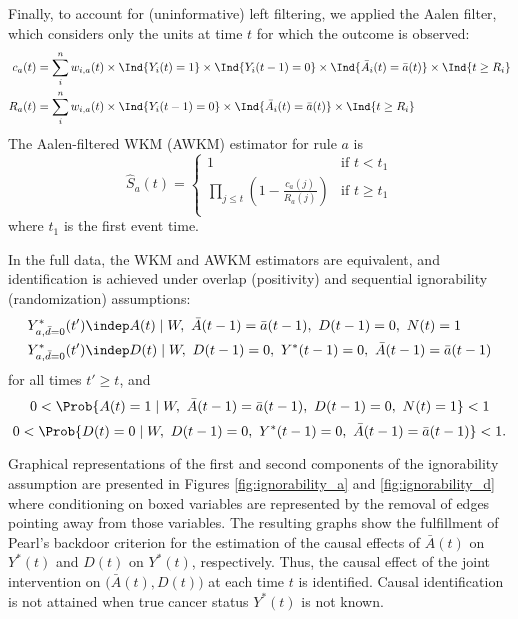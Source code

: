 \documentclass[
  11pt,
]{article}
\begin{document}
Finally, to account for (uninformative) left filtering, we applied the
Aalen filter, which considers only the units at time \(t\) for which the
outcome is observed: \[\begin{aligned}
c_{a} (t)
& = \sum_i^n w_{i, a}(t) \times \Ind{Y_i(t) = 1} \times \Ind{Y_i(t - 1) = 0} \times \Ind{\bar A_i (t) = \bar a(t)} \times \Ind{t \ge R_i} \\
R_{a} (t)
& = \sum_i^n w_{i, a}(t) \times \Ind{Y_i(t - 1) = 0} \times \Ind{\bar A_i (t) = \bar a(t)} \times \Ind{t \ge R_i}
\end{aligned}\] The Aalen-filtered WKM (AWKM) estimator for rule \(a\)
is \[\hat S_{a}(t) =
\begin{cases}
1 & \text{if } t < t_1 \\
\prod_{j \le t} \left(1 - \frac{c_{a}(j)}{R_{a}(j)}\right) & \text{if } t \ge t_1 \\
\end{cases}\] where \(t_1\) is the first event time.

In the full data, the WKM and AWKM estimators are equivalent, and
identification is achieved under overlap (positivity) and sequential
ignorability (randomization) assumptions: \[\begin{aligned}
Y^*_{a, \bar d = 0} (t')   & \indep A(t) \mid W,\ \bar A(t - 1) = \bar a(t - 1),\ D(t - 1) = 0,\ N(t) = 1\\
Y^*_{a, \bar d = 0} (t') & \indep D(t) \mid W,\ D(t - 1) = 0,\ Y^*(t - 1) = 0,\ \bar A(t - 1) = \bar a(t - 1)
\end{aligned}\] for all times \(t'\ge t\), and
\[0 < \Prob{ A(t) = 1 \mid W,\ \bar A(t - 1) = \bar a(t - 1),\ D(t - 1) = 0,\ N(t) = 1} < 1\]
\[0 < \Prob{D(t) = 0 \mid W,\ D(t - 1) = 0,\ Y^*(t - 1) = 0,\ \bar A(t - 1) = \bar a(t - 1)} < 1.\]

Graphical representations of the first and second components of the
ignorability assumption are presented in Figures
\ref{fig:ignorability_a} and \ref{fig:ignorability_d} where conditioning
on boxed variables are represented by the removal of edges pointing away
from those variables. The resulting graphs show the fulfillment of
Pearl's backdoor criterion for the estimation of the causal effects of
\(\bar A(t)\) on \(Y^*(t)\) and \(D(t)\) on \(Y^*(t)\), respectively.
Thus, the causal effect of the joint intervention on
\(\big(\bar A(t), D(t)\big)\) at each time \(t\) is identified. Causal
identification is not attained when true cancer status \(Y^*(t)\) is not
known.
\end{document}
